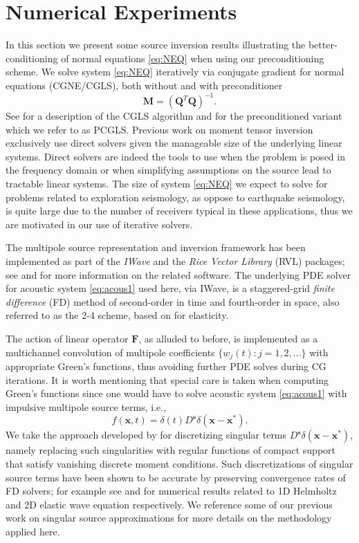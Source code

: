 \section{Numerical Experiments}

In this section we present some source inversion results illustrating the better-conditioning of normal equations \ref{eq:NEQ} when using our preconditioning scheme.
We solve system \ref{eq:NEQ} iteratively via conjugate gradient for normal equations (CGNE/CGLS), both without and with preconditioner 
\[
	\mathbf M = (\mathbf Q^T\mathbf Q)^{-1}.
\]
See \cite{Paige:82} for a description of the CGLS algorithm and \cite{NocedalWright} for the preconditioned variant which we refer to as PCGLS.
Previous work on moment tensor inversion exclusively use direct solvers given the manageable size of the underlying linear systems.
Direct solvers are indeed the tools to use when the problem is posed in the frequency domain or when simplifying assumptions on the source lead to tractable linear systems.
The size of system \ref{eq:NEQ} we expect to solve for problems related to exploration seismology, as oppose to earthquake seismology, is quite large due to the number of receivers typical in these applications, thus we are motivated in our use of iterative solvers.

The multipole source representation and inversion framework has been implemented as part of the \emph{IWave} and the \emph{Rice Vector Library} (RVL) packages; see \cite{GeoPros:11} and \cite{RVL_TOMS} for more information on the related software.%
The underlying PDE solver for acoustic system \ref{eq:acous1} used here, via IWave, is a staggered-grid \emph{finite difference} (FD) method of second-order in time and fourth-order in space, also referred to as the 2-4 scheme, based on \cite{mad:dyn} for elasticity.

The action of linear operator $\mathbf F$, as alluded to before, is implemented as a multichannel convolution of multipole coefficients $\{w_j(t):j=1,2,...\}$ with appropriate Green's functions, thus avoiding further PDE solves during CG iterations.
It is worth mentioning that special care is taken when computing Green's functions since one would have to solve acoustic system \ref{eq:acous1} with impulsive multipole source terms, i.e., 
\[
 	f(\mathbf x,t) = \delta(t) D^{\mathbf s}\delta(\mathbf x-\mathbf x^*).
\]
We take the approach developed by \cite{Walden:1999} for discretizing singular terms $D^{\mathbf s}\delta(\mathbf x-\mathbf x^*)$, namely replacing such singularities with regular functions of compact support that satisfy vanishing discrete moment conditions.
Such discretizations of singular source terms have been shown to be accurate by preserving convergence rates of FD solvers; for example see \cite{Walden:1999} and \cite{Petersson:2010} for numerical results related to 1D Helmholtz and 2D elastic wave equation respectively.
We reference some of our previous work on singular source approximations \cite{MPStheory} for more details on the methodology applied here.

